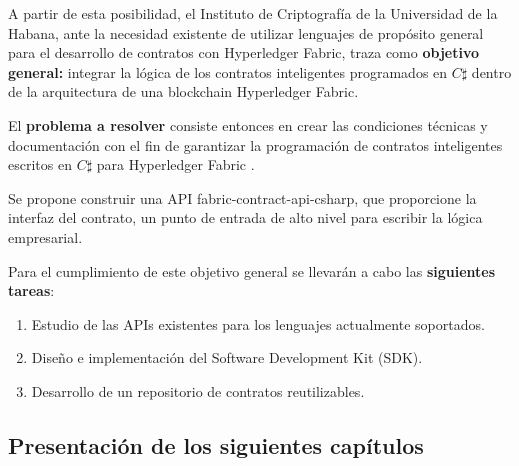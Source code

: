 
A partir de esta posibilidad, el Instituto de Criptografía de la Universidad de la Habana, ante la necesidad existente de utilizar lenguajes de propósito general para el desarrollo de contratos con Hyperledger Fabric, traza como    \textbf{objetivo general:} integrar la lógica de los contratos inteligentes programados en $C\sharp$ dentro de la arquitectura de una blockchain Hyperledger Fabric.


El \textbf{problema a resolver} consiste entonces en crear las condiciones técnicas y documentación con el fin de garantizar la programación de contratos inteligentes escritos en $C\sharp$ para Hyperledger Fabric  .

Se propone construir una API fabric-contract-api-csharp,  que proporcione la interfaz del contrato, un punto de entrada de alto nivel para escribir la lógica empresarial.

Para el cumplimiento de este objetivo general se llevarán a cabo las \textbf{siguientes tareas}:

\begin{enumerate}
\item Estudio de las APIs existentes para los lenguajes actualmente soportados.
\item Diseño e implementación del Software Development Kit (SDK).
\item Desarrollo de un repositorio de contratos reutilizables.
\end{enumerate}

\subsection*{Presentación de los siguientes capítulos}	
